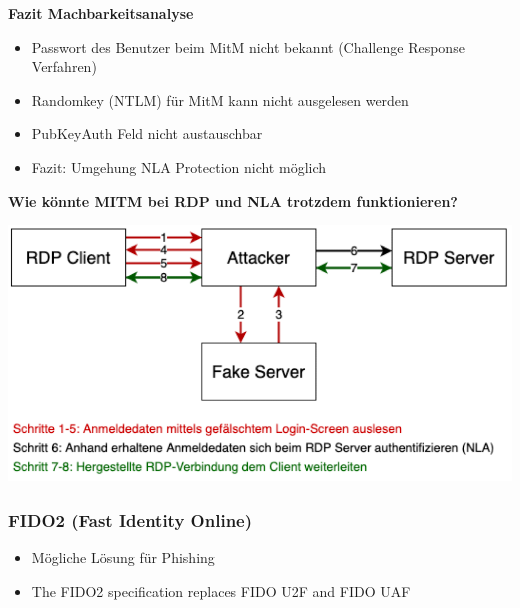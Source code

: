 \textbf{Fazit Machbarkeitsanalyse}
\begin{itemize}
    \item Passwort des Benutzer beim MitM nicht bekannt (Challenge Response Verfahren)
    \item Randomkey (NTLM) für MitM kann nicht ausgelesen werden
    \item PubKeyAuth Feld nicht austauschbar
    \item Fazit: Umgehung NLA Protection nicht möglich
\end{itemize}
\textbf{Wie könnte MITM bei RDP und NLA trotzdem funktionieren?}
\begin{center}
    \vspace{-8pt}
    \includegraphics[width=1.0\linewidth]{./img/09-mitm/rdp_works}
    \vspace{-8pt}
\end{center}

\subsubsection{FIDO2 (Fast Identity Online)}
\begin{itemize}
    \item Mögliche Lösung für Phishing
    \item The FIDO2 specification replaces FIDO U2F and FIDO UAF
\end{itemize}

